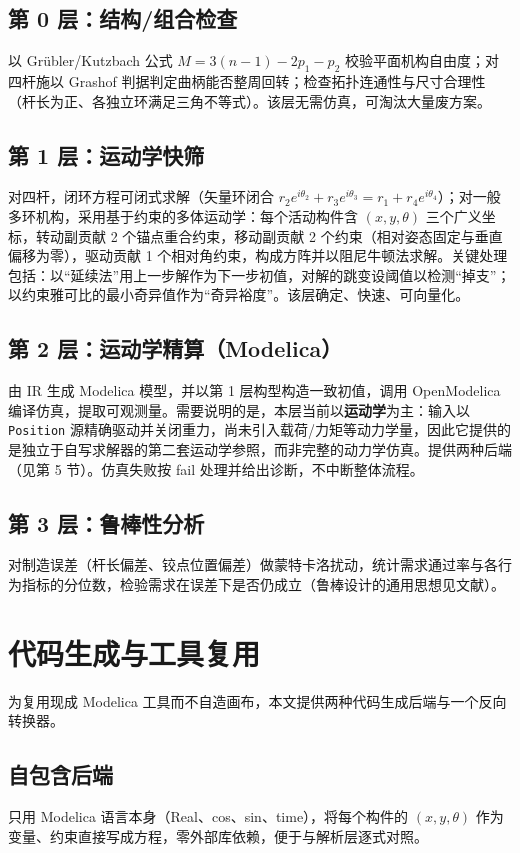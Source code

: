 \documentclass[UTF8,11pt,a4paper]{ctexart}
\begin{document}
\subsection{第 0 层：结构/组合检查}
以 Gr\"ubler/Kutzbach 公式 $M = 3(n-1) - 2p_1 - p_2$ 校验平面机构自由度；对四杆施以 Grashof 判据判定曲柄能否整周回转；检查拓扑连通性与尺寸合理性（杆长为正、各独立环满足三角不等式）。该层无需仿真，可淘汰大量废方案。

\subsection{第 1 层：运动学快筛}
对四杆，闭环方程可闭式求解（矢量环闭合 $r_2 e^{i\theta_2} + r_3 e^{i\theta_3} = r_1 + r_4 e^{i\theta_4}$）；对一般多环机构，采用基于约束的多体运动学：每个活动构件含 $(x,y,\theta)$ 三个广义坐标，转动副贡献 2 个锚点重合约束，移动副贡献 2 个约束（相对姿态固定与垂直偏移为零），驱动贡献 1 个相对角约束，构成方阵并以阻尼牛顿法求解。关键处理包括：以``延续法''用上一步解作为下一步初值，对解的跳变设阈值以检测``掉支''；以约束雅可比的最小奇异值作为``奇异裕度''。该层确定、快速、可向量化。

\subsection{第 2 层：运动学精算（Modelica）}
由 IR 生成 Modelica 模型，并以第 1 层构型构造一致初值，调用 OpenModelica 编译仿真，提取可观测量。需要说明的是，本层当前以\textbf{运动学}为主：输入以 \texttt{Position} 源精确驱动并关闭重力，尚未引入载荷/力矩等动力学量，因此它提供的是独立于自写求解器的第二套运动学参照，而非完整的动力学仿真。提供两种后端（见第 5 节）。仿真失败按 fail 处理并给出诊断，不中断整体流程。

\subsection{第 3 层：鲁棒性分析}
对制造误差（杆长偏差、铰点位置偏差）做蒙特卡洛扰动，统计需求通过率与各行为指标的分位数，检验需求在误差下是否仍成立（鲁棒设计的通用思想见文献\cite{beyer2007}）。

\section{代码生成与工具复用}
为复用现成 Modelica 工具而不自造画布，本文提供两种代码生成后端与一个反向转换器。

\subsection{自包含后端}
只用 Modelica 语言本身（Real、cos、sin、time），将每个构件的 $(x,y,\theta)$ 作为变量、约束直接写成方程，零外部库依赖，便于与解析层逐式对照。
\end{document}
